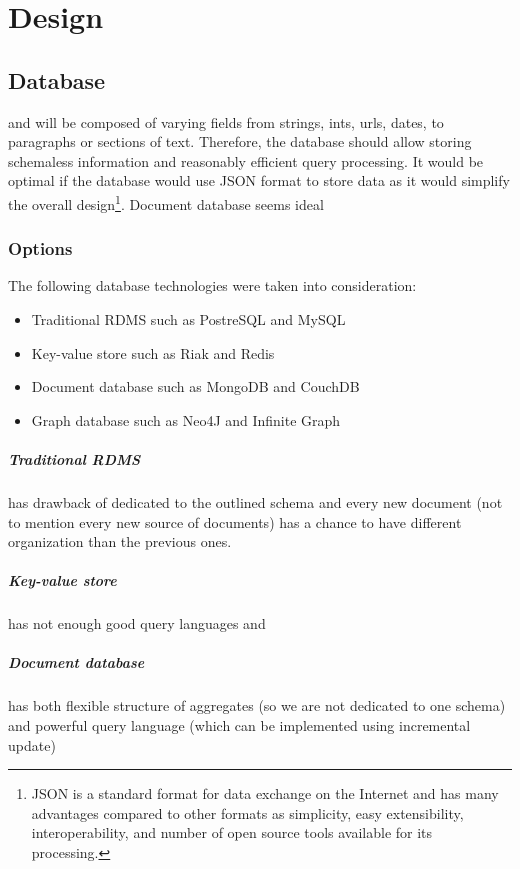 \documentclass{tufte-book}
\begin{document}

\chapter{Design}

\section{Database}
 and will be composed of varying fields from strings, ints, urls, dates, to paragraphs or sections of text. Therefore, the database should allow storing schemaless information and reasonably efficient query processing. It would be optimal if the database would use JSON format to store data as it would simplify the overall design\footnote{JSON is a standard format for data exchange on the Internet and has many advantages compared to other formats as simplicity, easy extensibility, interoperability, and number of open source tools available for its processing.}.
Document database seems ideal

\subsection{Options}
The following database technologies were taken into consideration:
\begin{itemize}
  \item Traditional RDMS such as PostreSQL and MySQL
  \item Key-value store such as Riak and Redis
  \item Document database such as MongoDB and CouchDB
  \item Graph database such as Neo4J and Infinite Graph
\end{itemize}

\paragraph{Traditional RDMS} has drawback of dedicated to the outlined schema and every new document (not to mention every new source of documents) has a chance to have different organization than the previous ones.

\paragraph{Key-value store} has not enough good query languages and 

\paragraph{Document database} has both flexible structure of aggregates (so we are not dedicated to one schema) and powerful query language (which can be implemented using incremental update)
\end{document}
